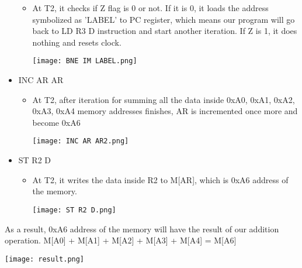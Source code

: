 \documentclass[pdftex,12pt,a4paper]{article}
\begin{document}
\begin{itemize}
    \begin{itemize}
        \item At T2, it checks if Z flag is 0 or not. If it is 0, it loads the address symbolized as 'LABEL' to PC register, which means our program will go back to LD R3 D instruction and start another iteration. If Z is 1, it does nothing and resets clock.
        \begin{center}
            \texttt{[image: BNE IM LABEL.png]}\newline
        	\label{fig1}
        \end{center}
    \end{itemize}
    \item INC AR AR
    \begin{itemize}
        \item At T2, after iteration for summing all the data inside 0xA0, 0xA1, 0xA2, 0xA3, 0xA4 memory addresses finishes, AR is incremented once more and become 0xA6 
        \begin{center}
            \texttt{[image: INC AR AR2.png]}\newline
        	\label{fig1}
        \end{center}
    \end{itemize}
    \item ST R2 D
    \begin{itemize}
        \item At T2, it writes the data inside R2 to M[AR], which is 0xA6 address of the memory.
        \begin{center}
            \texttt{[image: ST R2 D.png]}\newline
        	\label{fig1}
        \end{center}
    \end{itemize}
\end{itemize}  
As a result, 0xA6 address of the memory will have the result of our addition operation.
M[A0] + M[A1] + M[A2] + M[A3] + M[A4] = M[A6]
\begin{center}
    \texttt{[image: result.png]}\newline
    \label{fig1}
\end{center}
\end{document}
